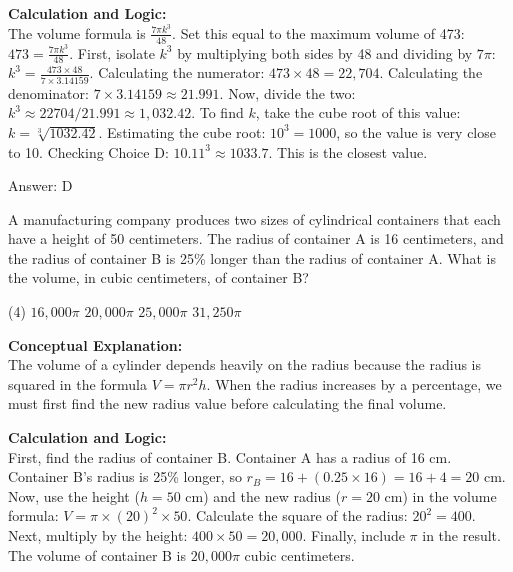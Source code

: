 \documentclass[11pt,paper=a4,answers]{exam}
\begin{document}
\begin{questions}
\begin{solution}
\textbf{Calculation and Logic:} \\
The volume formula is $\frac{7\pi k^3}{48}$. Set this equal to the maximum volume of 473: $473 = \frac{7\pi k^3}{48}$. First, isolate $k^3$ by multiplying both sides by 48 and dividing by $7\pi$: $k^3 = \frac{473 \times 48}{7 \times 3.14159}$. Calculating the numerator: $473 \times 48 = 22,704$. Calculating the denominator: $7 \times 3.14159 \approx 21.991$. Now, divide the two: $k^3 \approx 22704 / 21.991 \approx 1,032.42$. To find $k$, take the cube root of this value: $k = \sqrt[3]{1032.42}$. Estimating the cube root: $10^3 = 1000$, so the value is very close to 10. Checking Choice D: $10.11^3 \approx 1033.7$. This is the closest value.

\vspace{30pt}

Answer: \colorbox{yellow!100}{D}
\end{solution}

\vspace{60pt}

\question
A manufacturing company produces two sizes of cylindrical containers that each have a height of 50 centimeters. The radius of container A is 16 centimeters, and the radius of container B is 25\% longer than the radius of container A. What is the volume, in cubic centimeters, of container B?
\begin{tasks}(4)
    \task $16,000\pi$
    \task $20,000\pi$
    \task $25,000\pi$
    \task $31,250\pi$
\end{tasks}

\begin{solution}
\textbf{Conceptual Explanation:} \\
The volume of a cylinder depends heavily on the radius because the radius is squared in the formula $V = \pi r^2 h$. When the radius increases by a percentage, we must first find the new radius value before calculating the final volume.

\vspace{30pt}

\textbf{Calculation and Logic:} \\
First, find the radius of container B. Container A has a radius of 16 cm. Container B's radius is 25\% longer, so $r_B = 16 + (0.25 \times 16) = 16 + 4 = 20$ cm. Now, use the height ($h = 50$ cm) and the new radius ($r = 20$ cm) in the volume formula: $V = \pi \times (20)^2 \times 50$. Calculate the square of the radius: $20^2 = 400$. Next, multiply by the height: $400 \times 50 = 20,000$. Finally, include $\pi$ in the result. The volume of container B is $20,000\pi$ cubic centimeters.


\end{solution}
\end{questions}
\end{document}

